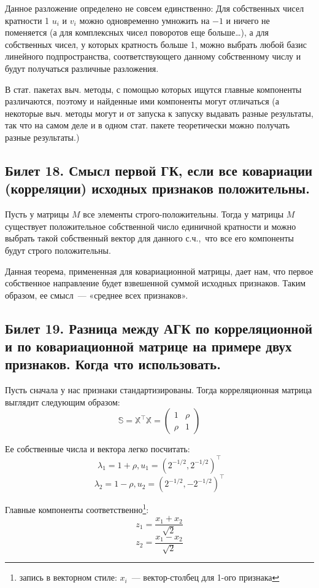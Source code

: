 Данное разложение определено не совсем единственно: Для собственных чисел кратности 1 $u_i$ и $v_i$ можно одновременно умножить на $-1$ и ничего не поменяется (а для комплексных чисел поворотов еще больше…), а 
для собственных чисел, у которых кратность больше 1, можно выбрать любой базис линейного подпространства, соответствующего данному собственному числу и будут получаться различные разложения. 

В стат. пакетах выч. методы, с помощью которых ищутся главные компоненты различаются, поэтому и найденные ими компоненты могут отличаться (а некоторые выч. методы могут и от запуска к запуску выдавать разные результаты, так что на самом деле и в одном стат. пакете теоретически можно получать разные результаты.)

\subsection{Билет 18. Смысл первой ГК, если все ковариации (корреляции) исходных признаков положительны.}
\begin{thm}
Пусть у матрицы $M$ все элементы строго-положительны. Тогда у матрицы $M$ существует положительное собственной число единичной кратности и можно выбрать такой собственный вектор для данного с.ч., что все его компоненты будут строго положительны.
\end{thm}
Данная теорема, примененная для ковариационной матрицы, дает нам, что первое собственное направление будет взвешенной суммой исходных признаков. Таким образом, ее смысл — «среднее всех признаков». 

\subsection{Билет 19. Разница между АГК по корреляционной и по ковариационной матрице на примере двух признаков.
Когда что использовать.}  

Пусть сначала у нас признаки стандартизированы. Тогда корреляционная матрица выглядит следующим образом:
$$\mathbb{S} = \mathbb{X}^{\intercal} \mathbb{X} = \begin{pmatrix}
1 & \rho \\
\rho & 1
\end{pmatrix}
$$

Ее собственные числа и вектора легко посчитать:
$$\lambda_1  = 1+\rho, u_1 =(2^{-1/2}, 2^{-1/2})^{\intercal}$$
$$\lambda_2 = 1-\rho, u_2 = (2^{-1/2},-2^{-1/2})^{\intercal}$$

Главные компоненты соответственно\footnote{запись в векторном стиле: $x_i$ — вектор-столбец для 1-ого признака}:
 $$ z_1 = \frac{x_1+x_2}{\sqrt{2}}$$
 $$z_2 = \frac{x_1-x_2}{\sqrt{2}}$$


